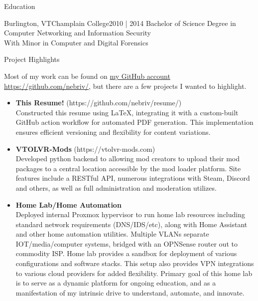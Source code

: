 \documentclass[]{mcdowellcv}
\begin{document}
\begin{cvsection}{Education}
    \begin{cvsubsection}{Burlington, VT}{Champlain College}{2010 | 2014}
        \vspace{-1em}Bachelor of Science Degree in Computer Networking and Information Security\\
        \hspace*{1em}With Minor in Computer and Digital Forensics
    \end{cvsubsection}
\end{cvsection}

\begin{cvsection}{Project Highlights}
    \begin{cvsubsection}{}{}{}
        Most of my work can be found on \href{https://github.com/nebriv/}{my GitHub account https://github.com/nebriv/}, but there are a few projects I wanted to highlight.\\
        \begin{itemize}
            \setlength\itemsep{3pt}
            \item \textbf{This Resume!} (https://github.com/nebriv/resume/)
            \\Constructed this resume using LaTeX, integrating it with a custom-built GitHub action workflow for automated PDF generation. This implementation ensures efficient versioning and flexibility for content variations.
            \item \textbf{VTOLVR-Mods} (https://vtolvr-mods.com)
            \\Developed python backend to allowing mod creators to upload their mod packages to a central location accessible by the mod loader platform. Site features include a RESTful API, numerous integrations with Steam, Discord and others, as well as full administration and moderation utilizes.
            \item \textbf{Home Lab/Home Automation}
            \\Deployed internal Proxmox hypervisor to run home lab resources including standard network requirements (DNS/IDS/etc), along with Home Assistant and other home automation utilities. Multiple VLANs separate IOT/media/computer systems, bridged with an OPNSense router out to commodity ISP. Home lab provides a sandbox for deployment of various configurations and software stacks. This setup also provides VPN integrations to various cloud providers for added flexibility. Primary goal of this home lab is to serve as a dynamic platform for ongoing education, and as a manifestation of my intrinsic drive to understand, automate, and innovate.
        \end{itemize}
    \end{cvsubsection}
\end{cvsection}
\end{document}
